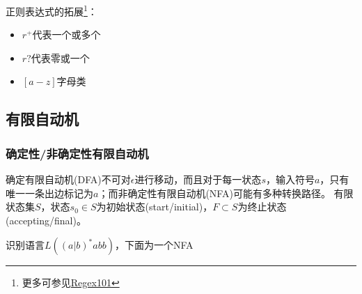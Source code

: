 正则表达式的拓展\footnote{更多可参见\href{https://regex101.com/}{Regex101}}：
\begin{itemize}
	\item $r^+$代表一个或多个
	\item $r?$代表零或一个
	\item $[a-z]$字母类
\end{itemize}

\subsection{有限自动机}
\subsubsection{确定性/非确定性有限自动机}
确定有限自动机(DFA)不可对$\epsilon$进行移动，而且对于每一状态$s$，输入符号$a$，只有唯一一条出边标记为$a$；而非确定性有限自动机(NFA)可能有多种转换路径。
有限状态集$S$，状态$s_0\in S$为初始状态(start/initial)，$F\subset S$为终止状态(accepting/final)。
\begin{example}
识别语言$L((a|b)^*abb)$，下面为一个NFA
\begin{center}
\end{center}
\end{example}

